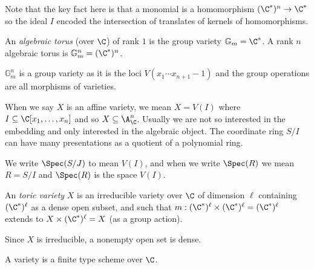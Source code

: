 \documentclass[a4paper]{article}
\begin{document}
Note that the key fact here is that a monomial is a homomorphism \((\C^*)^n \to \C^*\) so the ideal \(I\) encoded the intersection of translates of kernels of homomorphisms.

\begin{definition}
  An \emph{algebraic torus} (over \(\C\)) of rank \(1\) is the group variety \(\mathbb G_m = \C^*\). A rank \(n\) algebraic torus is \(\mathbb G_m^n = (\C^*)^n\).
\end{definition}

\begin{remark}
  \(\mathbb G_m^n\) is a group variety as it is the loci \(V(x_1 \cdots x_{n + 1} - 1)\) and the group operations are all morphisms of varieties.
\end{remark}

When we say \(X\) is an affine variety, we mean \(X = V(I)\) where \(I \subseteq \C[x_1, \dots, x_n]\) and so \(X \subseteq \A^n_\C\). Usually we are not so interested in the embedding and only interested in the algebraic object. The coordinate ring \(S/I\) can have many presentations as a quotient of a polynomial ring.

\begin{notation}
  We write \(\Spec (S/J)\) to mean \(V(I)\), and when we write \(\Spec(R)\) we mean \(R = S/I\) and \(\Spec(R)\) is the space \(V(I)\).
\end{notation}

\begin{definition}
  An \emph{toric variety} \(X\) is an irreducible variety over \(\C\) of dimension \(\ell\) containing \((\C^*)^\ell\) as a dense open subset, and such that \(m: (\C^*)^\ell \times (\C^*)^\ell = (\C^*)^\ell\) extends to \(X \times (\C^*)^\ell = X\) (as a group action).
\end{definition}

\begin{remark}
  Since \(X\) is irreducible, a nonempty open set is dense.
\end{remark}

\begin{remark}
  A variety is a finite type scheme over \(\C\).
\end{remark}
\end{document}
